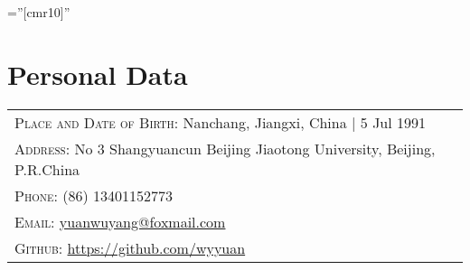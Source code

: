 \documentclass[a4paper,10pt]{article} %
\begin{document}
\pagestyle{empty} %

\font\fb=''[cmr10]'' %


\par{\bigskip\par} %

\section{Personal Data}

\begin{tabular}{l}
\textsc{Place and Date of Birth:}  Nanchang, Jiangxi, China | 5 Jul 1991 \\
\textsc{Address:}  No 3 Shangyuancun Beijing Jiaotong University, Beijing, P.R.China \\
\textsc{Phone:}  (86) 13401152773 \\
\textsc{Email:}  \href{mailto:yuanwuyang@foxmail.com}{yuanwuyang@foxmail.com}\\
\textsc{Github:} \url{https://github.com/wyyuan} \\
\end{tabular}


%
\end{document}
